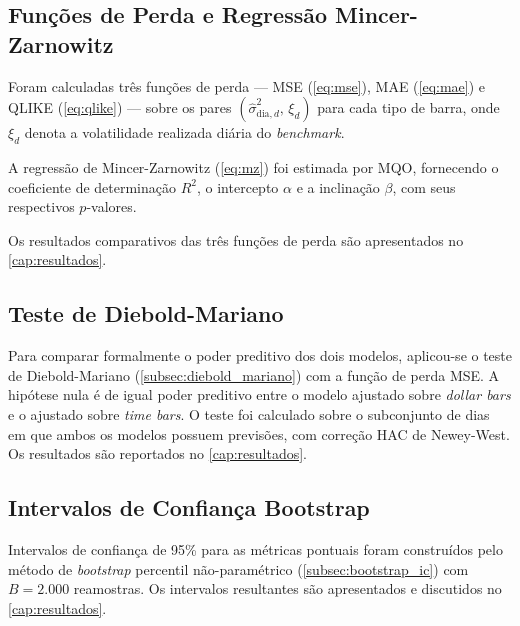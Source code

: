 \subsection{Funções de Perda e Regressão Mincer-Zarnowitz}
\label{subsec:met_funcoes_perda}

Foram calculadas três funções de perda --- MSE (\autoref{eq:mse}), MAE
(\autoref{eq:mae}) e QLIKE (\autoref{eq:qlike}) --- sobre os pares
$(\hat{\sigma}^2_{\text{dia},d},\, \xi_d)$ para cada tipo de barra, onde
$\xi_d$ denota a volatilidade realizada diária do \emph{benchmark}.

A regressão de Mincer-Zarnowitz (\autoref{eq:mz}) foi estimada por MQO,
fornecendo o coeficiente de determinação $R^2$, o intercepto $\alpha$ e a
inclinação $\beta$, com seus respectivos $p$-valores.

Os resultados comparativos das três funções de perda são apresentados no
\autoref{cap:resultados}.

\subsection{Teste de Diebold-Mariano}
\label{subsec:met_dm}

Para comparar formalmente o poder preditivo dos dois modelos, aplicou-se o
teste de Diebold-Mariano (\autoref{subsec:diebold_mariano}) com a função
de perda MSE. A hipótese nula é de igual poder preditivo entre o modelo
ajustado sobre \emph{dollar bars} e o ajustado sobre \emph{time bars}.
O teste foi calculado sobre o subconjunto de dias em que ambos os modelos
possuem previsões, com correção HAC de Newey-West. Os resultados são
reportados no \autoref{cap:resultados}.

\subsection{Intervalos de Confiança Bootstrap}
\label{subsec:met_bootstrap}

Intervalos de confiança de 95\% para as métricas pontuais foram
construídos pelo método de \emph{bootstrap} percentil não-paramétrico
(\autoref{subsec:bootstrap_ic}) com $B = 2.000$ reamostras. Os
intervalos resultantes são apresentados e discutidos no
\autoref{cap:resultados}.

